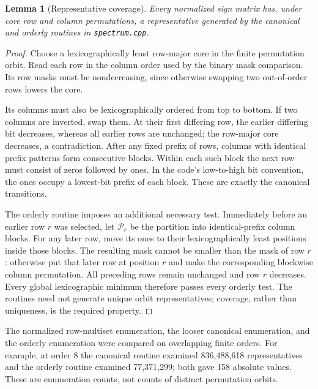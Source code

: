 \documentclass[11pt,a4paper]{article}
\newtheorem{lemma}[theorem]{Lemma}
\theoremstyle{remark}\newtheorem{remark}[theorem]{Remark}
\begin{document}
\begin{lemma}[Representative coverage]\label{lem:coverage}
Every normalized sign matrix has, under core row and column permutations, a representative generated by the canonical and orderly routines in \texttt{spectrum.cpp}.
\end{lemma}
\begin{proof}
Choose a lexicographically least row-major core in the finite permutation orbit. Read each row in the column order used by the binary mask comparison. Its row masks must be nondecreasing, since otherwise swapping two out-of-order rows lowers the core.

Its columns must also be lexicographically ordered from top to bottom. If two columns are inverted, swap them. At their first differing row, the earlier differing bit decreases, whereas all earlier rows are unchanged; the row-major core decreases, a contradiction. After any fixed prefix of rows, columns with identical prefix patterns form consecutive blocks. Within each such block the next row must consist of zeros followed by ones. In the code's low-to-high bit convention, the ones occupy a lowest-bit prefix of each block. These are exactly the canonical transitions.

The orderly routine imposes an additional necessary test. Immediately before an earlier row $r$ was selected, let $\mathcal P_r$ be the partition into identical-prefix column blocks. For any later row, move its ones to their lexicographically least positions inside those blocks. The resulting mask cannot be smaller than the mask of row $r$: otherwise put that later row at position $r$ and make the corresponding blockwise column permutation. All preceding rows remain unchanged and row $r$ decreases. Every global lexicographic minimum therefore passes every orderly test. The routines need not generate unique orbit representatives; coverage, rather than uniqueness, is the required property.
\end{proof}

The normalized row-multiset enumeration, the looser canonical enumeration, and the orderly enumeration were compared on overlapping finite orders. For example, at order 8 the canonical routine examined 836,488,618 representatives and the orderly routine examined 77,371,299; both gave 158 absolute values. These are enumeration counts, not counts of distinct permutation orbits.
\end{document}
